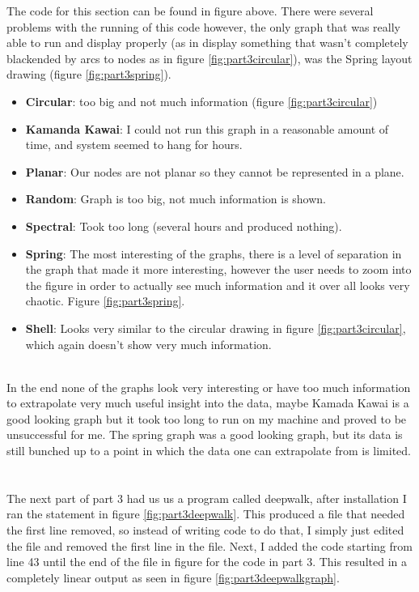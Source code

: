 \documentclass{article}
\begin{document}
The code for this section can be found in figure above. There were several problems with the running of this code however, the only graph that was really able to run and display properly (as in display something that wasn't completely blackended by arcs to nodes as in figure \ref{fig:part3circular}), was the Spring layout drawing (figure \ref{fig:part3spring}).
\begin{itemize}
    \item \textbf{Circular}: too big and not much information (figure \ref{fig:part3circular})
    \item \textbf{Kamanda Kawai}: I could not run this graph in a reasonable amount of time, and system seemed to hang for hours.
    \item \textbf{Planar}: Our nodes are not planar so they cannot be represented in a plane.
    \item \textbf{Random}: Graph is too big, not much information is shown.
    \item \textbf{Spectral}: Took too long (several hours and produced nothing).
    \item \textbf{Spring}: The most interesting of the graphs, there is a level of separation in the graph that made it more interesting, however the user needs to zoom into the figure in order to actually see much information and it over all looks very chaotic. Figure \ref{fig:part3spring}.
    \item \textbf{Shell}: Looks very similar to the circular drawing in figure \ref{fig:part3circular}, which again doesn't show very much information.
\end{itemize}
\\In the end none of the graphs look very interesting or have too much information to extrapolate very much useful insight into the data, maybe Kamada Kawai is a good looking graph but it took too long to run on my machine and proved to be unsuccessful for me. The spring graph was a good looking graph, but its data is still bunched up to a point in which the data one can extrapolate from is limited.
\\
\\
\\
The next part of part 3 had us us a program called deepwalk, after installation I ran the statement in figure \ref{fig:part3deepwalk}. This produced a file that needed the first line removed, so instead of writing code to do that, I simply just edited the file and removed the first line in the file. Next,  I added the code starting from line 43 until the end of the file in figure for the code in part 3.
This resulted in a completely linear output as seen in figure \ref{fig:part3deepwalkgraph}.
\end{document}
